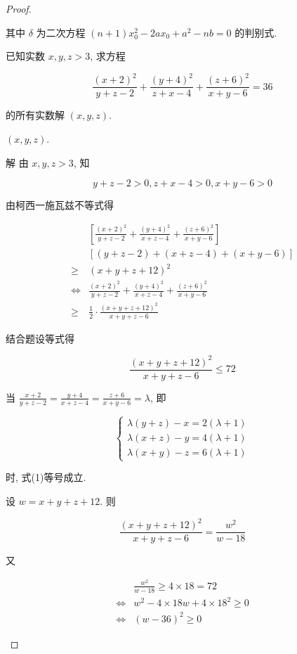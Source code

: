 \begin{proof}
\begin{example}
\begin{solution}
\begin{note}
	其中 $\delta$ 为二次方程 $(n+1) x_{0}^{2}-2 a x_{0}+a^{2}-n b=0$ 的判别式.
\end{note}

\begin{example}
	已知实数 $x, y, z>3$, 求方程
	
	$$
	\frac{(x+2)^{2}}{y+z-2}+\frac{(y+4)^{2}}{z+x-4}+\frac{(z+6)^{2}}{x+y-6}=36
	$$
	
	的所有实数解 $(x, y, z)$.
\end{example}
\begin{solution}
	$(x, y, z)$.
	
	解 由 $x, y, z>3$, 知
	
	$$
	y+z-2>0, z+x-4>0, x+y-6>0
	$$
	
	由柯西一施瓦兹不等式得
	
	$$
	\begin{aligned}
	& {\left[\frac{(x+2)^{2}}{y+z-2}+\frac{(y+4)^{2}}{x+z-4}+\frac{(z+6)^{2}}{x+y-6}\right] } \\
	& {[(y+z-2)+(x+z-4)+(x+y-6)] } \\
	\geqslant & (x+y+z+12)^{2} \\
	\Leftrightarrow & \frac{(x+2)^{2}}{y+z-2}+\frac{(y+4)^{2}}{x+z-4}+\frac{(z+6)^{2}}{x+y-6} \\
	\geqslant & \frac{1}{2} \cdot \frac{(x+y+z+12)^{2}}{x+y+z-6}
	\end{aligned}
	$$
	
	结合题设等式得
	
	
	\begin{equation*}
	\frac{(x+y+z+12)^{2}}{x+y+z-6} \leqslant 72 \tag{1}
	\end{equation*}
	
	
	当 $\frac{x+2}{y+z-2}=\frac{y+4}{x+z-4}=\frac{z+6}{x+y-6}=\lambda$, 即
	
	\[
	\left\{\begin{array}{l}
	\lambda(y+z)-x=2(\lambda+1)  \tag{2}\\
	\lambda(x+z)-y=4(\lambda+1) \\
	\lambda(x+y)-z=6(\lambda+1)
	\end{array}\right.
	\]
	
	时, 式(1)等号成立.
	
	设 $w=x+y+z+12$. 则
	
	$$
	\frac{(x+y+z+12)^{2}}{x+y+z-6}=\frac{w^{2}}{w-18}
	$$
	
	又
	
	$$
	\begin{aligned}
	& \frac{w^{2}}{w-18} \geqslant 4 \times 18=72 \\
	\Leftrightarrow & w^{2}-4 \times 18 w+4 \times 18^{2} \geqslant 0 \\
	\Leftrightarrow & (w-36)^{2} \geqslant 0
	\end{aligned}
	$$
	

\end{solution}
\end{solution}
\end{example}
\end{proof}
